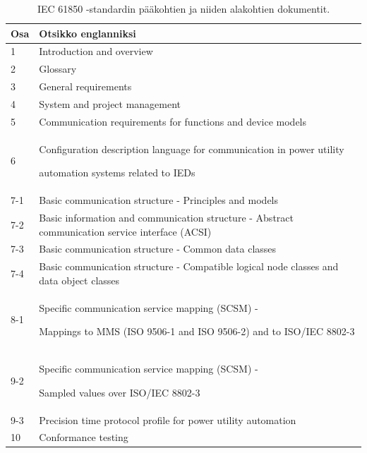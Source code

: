 \begin{table}[ht!]
	\caption{IEC 61850 -standardin pääkohtien ja niiden alakohtien dokumentit.}
	\label{tab:iec61850-dokumentin-osat}
	\begin{tabular}{l | l}
		\hline
		\textbf{Osa} & \textbf{Otsikko englanniksi} \\
		\hline \hline
		1 & Introduction and overview \\
		2 & Glossary \\
		3 & General requirements \\
		4 & System and project management \\
		5 & \parbox[t]{13cm}{Communication requirements for functions and device models} \\
		6 & \parbox[t]{13cm}{Configuration description language for communication in power utility \par automation systems related to IEDs} \\
		7-1 & \parbox[t]{13cm}{Basic communication structure - Principles and models} \\
		7-2 & \parbox[t]{13cm}{Basic information and communication structure - Abstract communication service interface (ACSI)} \\
		7-3 & \parbox[t]{13cm}{Basic communication structure - Common data classes} \\
		7-4 & \parbox[t]{13cm}{Basic communication structure - Compatible logical node classes and data object classes} \\
		8-1 & \parbox[t]{13cm}{Specific communication service mapping (SCSM) - \par  Mappings to MMS (ISO 9506-1 and ISO 9506-2) and to ISO/IEC 8802-3} \\
		9-2 & \parbox[t]{13cm}{Specific communication service mapping (SCSM) - \par  Sampled values over ISO/IEC 8802-3} \\
		9-3 & \parbox[t]{13cm}{Precision time protocol profile for power utility automation} \\
		10 & Conformance testing \\
		\hline
	\end{tabular}
\end{table}

